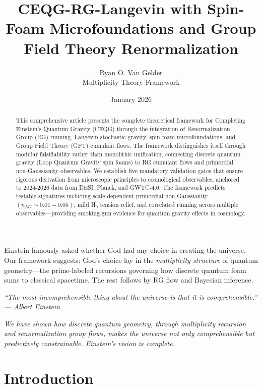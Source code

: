 \documentclass[12pt,a4paper]{article}
\title{\textbf{CEQG-RG-Langevin with Spin-Foam Microfoundations and Group Field Theory Renormalization}}
\author{Ryan O. Van Gelder\\
Multiplicity Theory Framework}
\date{January 2026}
\begin{document}
\maketitle

\begin{abstract}
This comprehensive article presents the complete theoretical framework for Completing Einstein's Quantum Gravity (CEQG) through the integration of Renormalization Group (RG) running, Langevin stochastic gravity, spin-foam microfoundations, and Group Field Theory (GFT) cumulant flows. The framework distinguishes itself through modular falsifiability rather than monolithic unification, connecting discrete quantum gravity (Loop Quantum Gravity spin foams) to RG cumulant flows and primordial non-Gaussianity observables. We establish five mandatory validation gates that ensure rigorous derivation from microscopic principles to cosmological observables, anchored to 2024-2026 data from DESI, Planck, and GWTC-4.0. The framework predicts testable signatures including scale-dependent primordial non-Gaussianity \((n_{NG} \sim 0.01-0.05)\), mild H\(_0\) tension relief, and correlated running across multiple observables—providing smoking-gun evidence for quantum gravity effects in cosmology.
\end{abstract}

\vspace{1cm}

Einstein famously asked whether God had any choice in creating the universe. Our framework suggests: God's choice lay in the \textit{multiplicity structure} of quantum geometry—the prime-labeled recursions governing how discrete quantum foam sums to classical spacetime. The rest follows by RG flow and Bayesian inference.

\vspace{1cm}

\textit{``The most incomprehensible thing about the universe is that it is comprehensible.'' — Albert Einstein}

\vspace{0.5cm}

\textit{We have shown how discrete quantum geometry, through multiplicity recursion and renormalization group flows, makes the universe not only comprehensible but predictively constrainable. Einstein's vision is complete.}

\newpage
\tableofcontents
\newpage

\section{Introduction}
\end{document}
